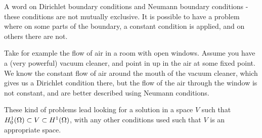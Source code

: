 A word on Dirichlet boundary conditions and Neumann boundary 
conditions - these conditions are not mutually exclusive.
It is possible to have a problem where on some parts of the boundary, 
a constant condition is applied, and on others there are not.

Take for example the flow of air in a room with open windows. 
Assume you have a (very powerful) vacuum cleaner,
 and point in up in the air at some fixed point. 
We know the constant flow of air around the mouth of the vacuum cleaner, which 
gives us a Dirichlet condition there, but the flow of the air through the 
window is not constant, and are better described using Neumann conditions.

These kind of problems lead looking for a solution in a space $V$ such that 
$H^1_0(\Omega) \subset V \subset H^1(\Omega)$, with any other conditions used such 
that $V$ is an appropriate space.